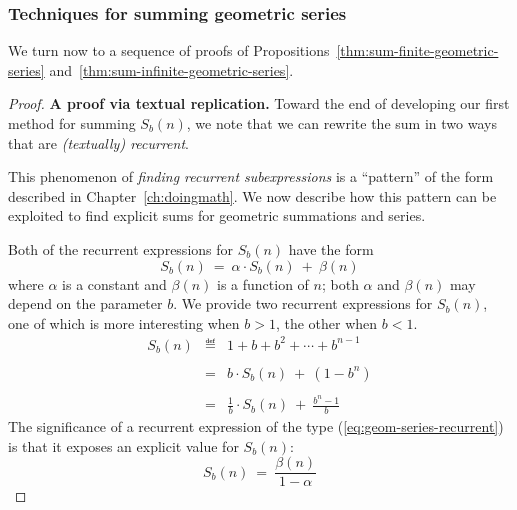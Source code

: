 \subsubsection{Techniques for summing geometric series}
\label{sec:summing-geometric-series:techniques}

We turn now to a sequence of proofs of Propositions~\ref{thm:sum-finite-geometric-series} and~\ref{thm:sum-infinite-geometric-series}.

\medskip

\begin{proof}
{\bf A proof via textual replication.}
Toward the end of developing our first method for summing $S_{b}(n)$, we note that we can rewrite the sum in two ways that are {\em (textually) recurrent}.

\bigskip

\noindent
This phenomenon of {\em finding recurrent subexpressions} is a ``pattern'' of the form described in Chapter~\ref{ch:doingmath}.  We now describe how this pattern can be exploited to find explicit sums for geometric summations and series.

\bigskip

\noindent
Both of the recurrent expressions for $S_{b}(n)$ have the form
\begin{equation}
\label{eq:geom-series-recurrent}
S_b(n) \ = \ \alpha \cdot S_b(n) \ + \ \beta(n)
\end{equation}
where $\alpha$ is a constant and $\beta(n)$ is a function of $n$; both $\alpha$ and $\beta(n)$ may depend on the parameter $b$.  We provide two recurrent expressions for $S_b(n)$, one of which is more interesting when $b>1$, the other when $b<1$.
\begin{eqnarray}
\label{eq:geom-series-replicate}
\nonumber
S_{b}(n) 
  & \eqdef &
1+ b + b^2 + \cdots + b^{n-1}  \\
\nonumber
  &   &  \\
\label{eq:geom-series-replicate-1}
   & = & b \cdot S_{b}(n) \ + \ (1 - b^n) \\
\nonumber
   &  & \\
\label{eq:geom-series-replicate-2}
  & = &
\frac{1}{b} \cdot S_{b}(n) \ + \ \frac{b^n -1}{b} 
\end{eqnarray}
The significance of a recurrent expression of the type (\ref{eq:geom-series-recurrent}) is that it exposes an explicit value for $S_b(n)$:
\begin{equation}
\label{eq:geom-series-generic}
S_b(n) \ = \ \frac{\beta(n)}{1 - \alpha}
\end{equation}


\end{proof}

